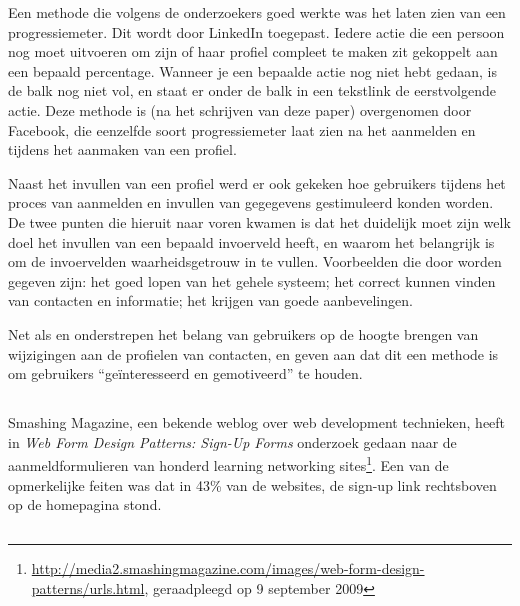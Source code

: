 \documentclass[a4paper, 10pt, pdftex]{report}
\begin{document}
    Een methode die volgens de onderzoekers goed werkte was het laten zien van een progressiemeter. Dit wordt door LinkedIn toegepast. Iedere actie die een persoon nog moet uitvoeren om zijn of haar profiel compleet te maken zit gekoppelt aan een bepaald percentage. Wanneer je een bepaalde actie nog niet hebt gedaan, is de balk nog niet vol, en staat er onder de balk in een tekstlink de eerstvolgende actie. Deze methode is (na het schrijven van deze paper) overgenomen door Facebook, die eenzelfde soort progressiemeter laat zien na het aanmelden en tijdens het aanmaken van een profiel.

    Naast het invullen van een profiel werd er ook gekeken hoe gebruikers tijdens het proces van aanmelden en invullen van gegegevens gestimuleerd konden worden. De twee punten die hieruit naar voren kwamen is dat het duidelijk moet zijn welk doel het invullen van een bepaald invoerveld heeft, en waarom het belangrijk is om de invoervelden waarheidsgetrouw in te vullen. Voorbeelden die door \citeauthor{Brouns2008} worden gegeven zijn: het goed lopen van het gehele systeem; het correct kunnen vinden van contacten en informatie; het krijgen van goede aanbevelingen.

    Net als \citet{Berlanga2007} en \citet{Sohn2005} onderstrepen \citeauthor{Brouns2008} het belang van gebruikers op de hoogte brengen van wijzigingen aan de profielen van contacten, en geven aan dat dit een methode is om gebruikers ``ge\"interesseerd en gemotiveerd'' te houden.

    \subsection{\cite{Editorial2008}}

    Smashing Magazine, een bekende weblog over web development technieken, heeft in \emph{Web Form Design Patterns: Sign-Up Forms} onderzoek gedaan naar de aanmeldformulieren van honderd learning networking sites\footnote{\url{http://media2.smashingmagazine.com/images/web-form-design-patterns/urls.html}, geraadpleegd op 9 september 2009}. Een van de opmerkelijke feiten was dat in 43\% van de websites, de sign-up link rechtsboven op de homepagina stond.

    \subsection{\cite{Sloep2009}}
\end{document}
